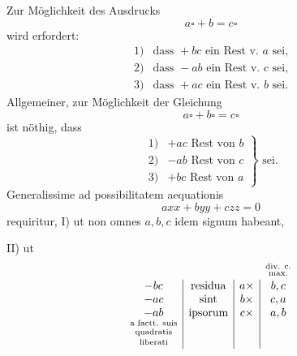 \NoSourceHead
{}
\noindent\hspace*{\parindent}Zur Möglichkeit des Ausdrucks
\[
a\square+b=c\square
\]
\noindent wird erfordert:
\[
\begin{array}{rl}
1)&\text{dass }+bc\text{ ein Rest v. }a\text{ sei,}\\
2)&\text{dass }-ab\text{ ein Rest v. }c\text{ sei,}\\
3)&\text{dass }+ac\text{ ein Rest v. }b\text{ sei.}
\end{array}
\]
\noindent Allgemeiner, zur Möglichkeit der Gleichung
\[
a\square+b\square=c\square
\]
\noindent ist nöthig, dass
\[
\left.\begin{array}{rl}
1)&+ac\text{ Rest von }b\\
2)&-ab\text{ Rest von }c\\
3)&+bc\text{ Rest von }a
\end{array}\right\}\text{ sei.}
\]
\noindent\hspace*{\parindent}Generalissime ad possibilitatem aequationis
\[
axx+byy+czz=0
\]
\noindent requiritur,
\clearpage
{}
\noindent\hspace*{\parindent}I) ut non omnes $a,b,c$ idem signum habeant,\par
\noindent\hspace*{\parindent}II) ut
\[
\begin{array}{cccc}
&&&\shortstack{\scriptsize div. c.\\\scriptsize max.}\\
\multicolumn{1}{c|}{-bc}&\multicolumn{1}{c|}{\text{residua}}&\multicolumn{1}{c|}{a\times}&b,c\\
\multicolumn{1}{c|}{-ac}&\multicolumn{1}{c|}{\text{sint}}&\multicolumn{1}{c|}{b\times}&c,a\\
\multicolumn{1}{c|}{-ab}&\multicolumn{1}{c|}{\text{ipsorum}}&\multicolumn{1}{c|}{c\times}&a,b\\
\multicolumn{1}{c|}{\shortstack{\scriptsize a factt. suis\\\scriptsize quadratis\\\scriptsize liberati}}&\multicolumn{1}{c|}{}&\multicolumn{1}{c|}{}&
\end{array}
\]
\ClosingRule
{}
